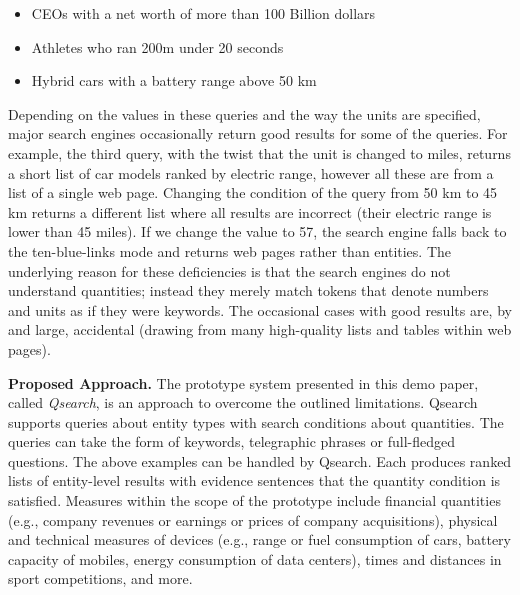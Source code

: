 \begin{itemize}
	\item CEOs with a net worth of more than 100 Billion dollars
	\item Athletes who ran 200m under 20 seconds
	\item Hybrid cars with a battery range above 50 km
\end{itemize}


Depending on the values in these queries and the way the units
are specified, major search engines occasionally return good results for
some of the queries. 
For example, the third query, with the twist that the unit is
changed to miles, returns a short list of car models ranked
by electric range, however all these are from a list of a single web page.
Changing the condition of the query from 50 km to 45 km returns a different list where all results
are incorrect (their electric range is lower than 45 miles).
If we change the value to 57, the search engine
falls back to the ten-blue-links mode and returns web pages
rather than entities.
The underlying reason for these deficiencies is that the search
engines do not understand quantities; instead they merely
match tokens that denote numbers and units as if they were keywords.
The occasional cases with good results are, by and large, accidental
(drawing from many high-quality lists and tables within web pages).




\noindent \textbf{Proposed Approach.} The prototype system presented in this demo paper, called {\em Qsearch},
is an approach to overcome the outlined limitations.
Qsearch supports queries about entity types with search conditions
about quantities. The queries can take the form of keywords, telegraphic phrases
or full-fledged questions. The above examples can be handled by Qsearch.
Each produces ranked lists of entity-level results with evidence sentences
that the quantity condition is satisfied.
Measures within the scope of the prototype include financial quantities
(e.g., company revenues or earnings or prices of company acquisitions),
physical and technical measures of devices (e.g., range or fuel consumption
of cars, battery capacity of mobiles, energy consumption of data centers),
times and distances in sport competitions, and more.

